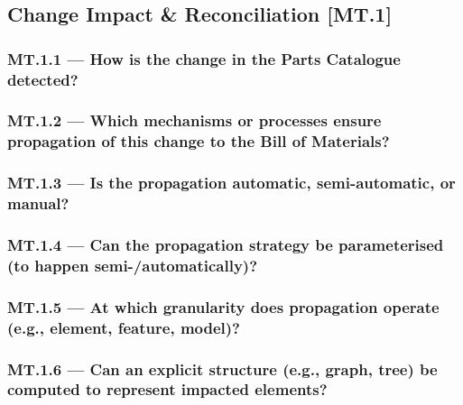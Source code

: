 \documentclass[sigconf,review]{acmart}
\begin{document}
\subsection{Change Impact \& Reconciliation [MT.1]}
\label{sec:MT1}

\subsubsection*{MT.1.1 --- How is the change in the Parts Catalogue detected?}
\label{sec:MT1-1}



\subsubsection*{MT.1.2 --- Which mechanisms or processes ensure propagation of this change to the Bill of Materials?}
\label{sec:MT1-2}



\subsubsection*{MT.1.3 --- Is the propagation automatic, semi-automatic, or manual?}
\label{sec:MT1-3}



\subsubsection*{MT.1.4 --- Can the propagation strategy be parameterised (to happen semi-/automatically)?}
\label{sec:MT1-4}



\subsubsection*{MT.1.5 --- At which granularity does propagation operate (e.g., element, feature, model)?}
\label{sec:MT1-5}



\subsubsection*{MT.1.6 --- Can an explicit structure (e.g., graph, tree) be computed to represent impacted elements?}
\label{sec:MT1-6}
\end{document}
